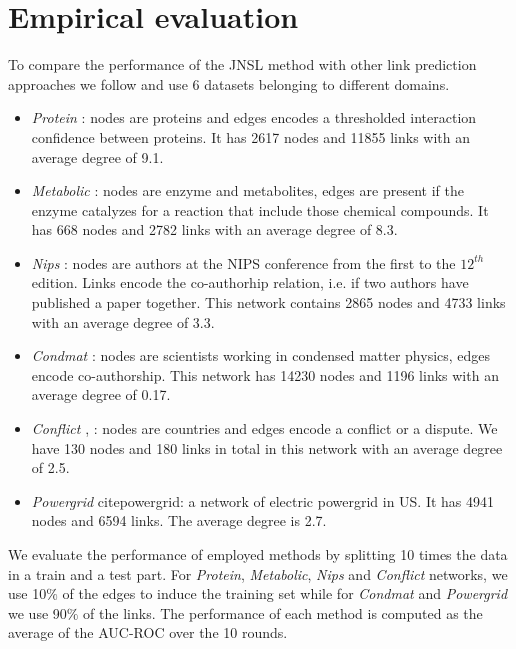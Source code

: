 \documentclass[runningheads,a4paper]{llncs}
\begin{document}
\section{Empirical evaluation}
To compare the performance of the JNSL method with other link prediction approaches we follow \cite{matrix-factorization} and use 6 datasets belonging to different domains.
\begin{itemize}
\item \textit{Protein }\cite{protein-protein}: nodes are proteins and edges encodes a thresholded interaction confidence between proteins. It has 2617 nodes and 11855 links with an average degree of 9.1.

\item \textit{Metabolic} \cite{metabolic}: nodes are enzyme and metabolites, edges are present if the enzyme catalyzes for a reaction that include those chemical compounds. It has 668 nodes and 2782 links with an average degree of 8.3.

\item \textit{Nips} \cite{nips}: nodes are authors at the NIPS conference from the first to the $12^{th}$ edition. Links encode the co-authorhip relation, i.e. if two authors have published a paper together. This network contains 2865 nodes and 4733 links with an average degree of 3.3.

\item \textit{Condmat} \cite{condmat}: nodes are scientists working in condensed matter physics, edges encode co-authorship. This network has 14230 nodes and 1196 links with an average degree of 0.17.

\item \textit{Conflict} \cite{conflict1}, \cite{conflict2}: nodes are countries and edges encode a conflict or a dispute. We have 130 nodes and 180 links in total in this network with an average degree of 2.5.

\item \textit{Powergrid} cite{powergrid}: a network of electric powergrid in US. It has 4941 nodes and 6594 links. The average degree is 2.7.
\end{itemize}

We evaluate the performance of employed methods by splitting 10 times the data in a train and a test part. For \textit{Protein}, \textit{Metabolic}, \textit{Nips} and \textit{Conflict} networks, we use 10$\%$ of the edges to induce the training set while for \textit{Condmat} and \textit{Powergrid} we use 90$\%$ of the links. The performance of each method is computed as the average of the AUC-ROC over the 10 rounds.
\end{document}
